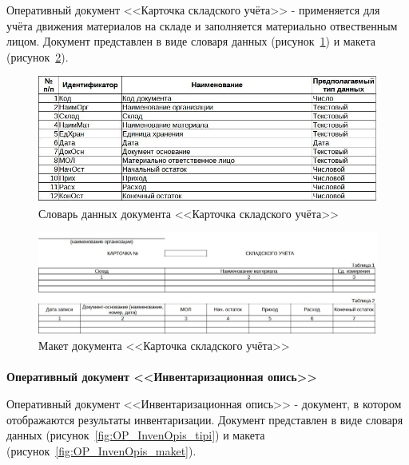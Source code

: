 \documentclass[12pt, a4paper, simple]{eskdtext}
\begin{document}
    Оперативный документ <<Карточка складского учёта>> - применяется для учёта движения материалов на складе
    и заполняется материально отвественным лицом.
    Документ представлен в виде словаря данных (рисунок~\ref{fig:OP_KartSklYch_tipi})
    и макета (рисунок~\ref{fig:OP_KartSklYch_maket}).

    \begin{figure}[!h]
        \centering
        \includegraphics[width=14cm]
            {_docs/ОП_КартСклУч_типы.jpg}
        \caption{Словарь данных документа <<Карточка складского учёта>>}
        \label{fig:OP_KartSklYch_tipi}
    \end{figure}

    \begin{figure}[!h]
        \centering
        \includegraphics[width=14cm]
            {_docs/ОП_КартСклУч_макет.jpg}
        \caption{Макет документа <<Карточка складского учёта>>}
        \label{fig:OP_KartSklYch_maket}
    \end{figure}
    
    \newpage
    \paragraph{} \textbf{Оперативный документ <<Инвентаризационная опись>>}

    Оперативный документ <<Инвентаризационная опись>>
    - документ, в котором отображаются результаты инвентаризации.
    Документ представлен в виде словаря данных (рисунок~\ref{fig:OP_InvenOpis_tipi})
    и макета (рисунок~\ref{fig:OP_InvenOpis_maket}).
\end{document}
